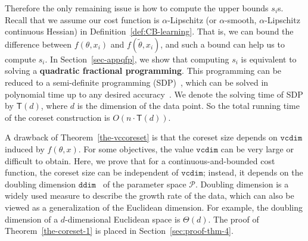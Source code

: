 \documentclass{article}
\begin{document}
Therefore the only remaining issue is how  to compute the upper bounds $ s_i $s.  Recall that we assume our cost function is $\alpha$-Lipschitz (or $\alpha$-smooth, $ \alpha $-Lipschitz continuous Hessian) in Definition~\ref{def:CB-learning}. That is, we can bound the difference between $f(\theta, x_i) $ and $f(\tilde{\theta}, x_i)$, and such a bound can help us to compute $s_i$. 
In Section~\ref{sec-appqfp}, we show that computing $s_i$  is equivalent to solving a \textbf{quadratic fractional programming}. This programming can be reduced to a semi-definite programming (SDP)~\cite{BeckT09}, which can be solved in polynomial time up to any desired accuracy~\cite{aasdp}. We denote the solving time of SDP by $ \mathsf{T}(d) $, where $ d $ is the dimension of the data point. So the total running time of the coreset construction is $ O(n\cdot \mathsf{T}(d)) $.



A drawback of Theorem~\ref{the-vccoreset} is that the coreset size depends on $ \mathtt{vcdim}$ induced by $ f(\theta,x) $. For some objectives, the value $ \mathtt{vcdim}$ can be very large or difficult to obtain. Here, we prove that for a continuous-and-bounded cost function, the coreset size can be independent of $ \mathtt{vcdim}$; instead, it depends on the doubling dimension $\mathtt{ddim}$~\cite{DBLP:journals/talg/ChanGMZ16} of the parameter space $\mathcal{P}$. Doubling dimension is a widely used measure to describe the growth rate of the data, which can also be viewed as a generalization of the Euclidean dimension. For example, the doubling dimension of a $d$-dimensional Euclidean space is $\Theta(d)$. 
The proof of Theorem~\ref{the-coreset-1} is placed in Section~\ref{sec:proof-thm-4}. 
\end{document}
